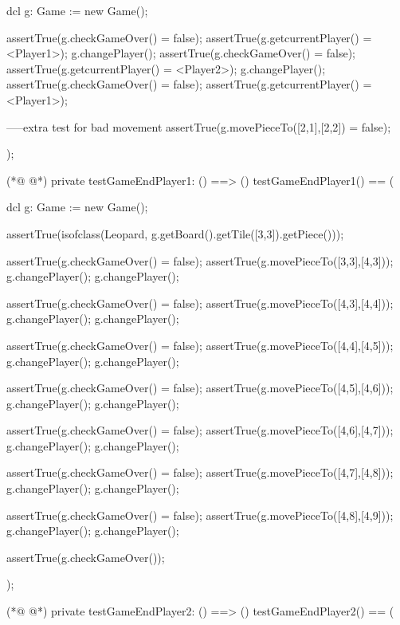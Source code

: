 \begin{vdmpp}[breaklines=true]
        dcl g: Game := new Game();
        
        assertTrue(g.checkGameOver() = false);
        assertTrue(g.getcurrentPlayer() = <Player1>);
        g.changePlayer();
        assertTrue(g.checkGameOver() = false);
        assertTrue(g.getcurrentPlayer() = <Player2>);
        g.changePlayer();
        assertTrue(g.checkGameOver() = false);
        assertTrue(g.getcurrentPlayer() = <Player1>);
        
        
        -----extra test for bad movement
        assertTrue(g.movePieceTo([2,1],[2,2]) = false);

  );
  
(*@
\label{testGameEndPlayer1:313}
@*)
              private testGameEndPlayer1: () ==> ()
         testGameEndPlayer1() ==
         (
         
         dcl g: Game := new Game();
         
         assertTrue(isofclass(Leopard, g.getBoard().getTile([3,3]).getPiece()));
         
         assertTrue(g.checkGameOver() = false);
         assertTrue(g.movePieceTo([3,3],[4,3]));
         g.changePlayer(); g.changePlayer();
         
         assertTrue(g.checkGameOver() = false);
         assertTrue(g.movePieceTo([4,3],[4,4]));
         g.changePlayer(); g.changePlayer();
         
         assertTrue(g.checkGameOver() = false);
         assertTrue(g.movePieceTo([4,4],[4,5]));
         g.changePlayer(); g.changePlayer();
         
         assertTrue(g.checkGameOver() = false);
         assertTrue(g.movePieceTo([4,5],[4,6]));
         g.changePlayer(); g.changePlayer();
         
         assertTrue(g.checkGameOver() = false);
         assertTrue(g.movePieceTo([4,6],[4,7]));
         g.changePlayer(); g.changePlayer();
         
         assertTrue(g.checkGameOver() = false);
         assertTrue(g.movePieceTo([4,7],[4,8]));
         g.changePlayer(); g.changePlayer();
         
         assertTrue(g.checkGameOver() = false);
         assertTrue(g.movePieceTo([4,8],[4,9]));
         g.changePlayer(); g.changePlayer();
         
         assertTrue(g.checkGameOver());

  );
  
(*@
\label{testGameEndPlayer2:353}
@*)
                private testGameEndPlayer2: () ==> ()
         testGameEndPlayer2() ==
         (
         

\end{vdmpp}
